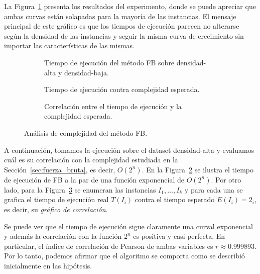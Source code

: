 \documentclass[10pt,a4paper]{article}
\begin{document}
La Figura~\ref{fig:fb-comparacion-densidad} presenta los resultados del experimento, donde se puede apreciar que ambas curvas están solapadas para la mayoría de las instancias. El mensaje principal de este gráfico es que los tiempos de ejecución parecen no alterarse según la densidad de las instancias y seguir la misma curva de crecimiento sin importar las características de las mismas.

\begin{figure}
    \centering
    \begin{subfigure}{0.3\linewidth}
        \centering
        
        \caption{Tiempo de ejecución del método FB sobre densidad-alta y densidad-baja.}
        \label{fig:fb-comparacion-densidad}
    \end{subfigure}
    \begin{subfigure}{0.3\linewidth}
        \centering
        
        \caption{Tiempo de ejecución contra complejidad esperada.}
        \label{fig:fb-complejidad-a}
    \end{subfigure}
    \begin{subfigure}{0.3\linewidth}
        \centering
        
        \caption{Correlación entre el tiempo de ejecución y la complejidad esperada.}
        \label{fig:fb-complejidad-b}
    \end{subfigure}
    \caption{Análisis de complejidad del método FB.}
    \label{fig:fb-complejidad}
\end{figure}

A continuación, tomamos la ejecución sobre el dataset densidad-alta y evaluamos cuál es su correlación con la complejidad estudiada en la Sección~\ref{sec:fuerza_bruta}, es decir, $O(2^n)$. En la Figura~\ref{fig:fb-complejidad-a} se ilustra el tiempo de ejecución de FB a la par de una función exponencial de $O(2^n)$. Por otro lado, para la Figura~\ref{fig:fb-complejidad-b} se enumeran las instancias $I_1, \hdots, I_k$ y para cada una se grafica el tiempo de ejecución real $T(I_i)$ contra el tiempo esperado $E(I_i) = 2_i$, es decir, su \emph{gráfico de correlación}.

Se puede ver que el tiempo de ejecución sigue claramente una curval exponencial y además la correlación con la función $2^n$ es positiva y casi perfecta. En particular, el índice de correlación de Pearson de ambas variables es $r \approx 0.999893$. Por lo tanto, podemos afirmar que el algoritmo se comporta como se describió inicialmente en las hipótesis.
\end{document}
